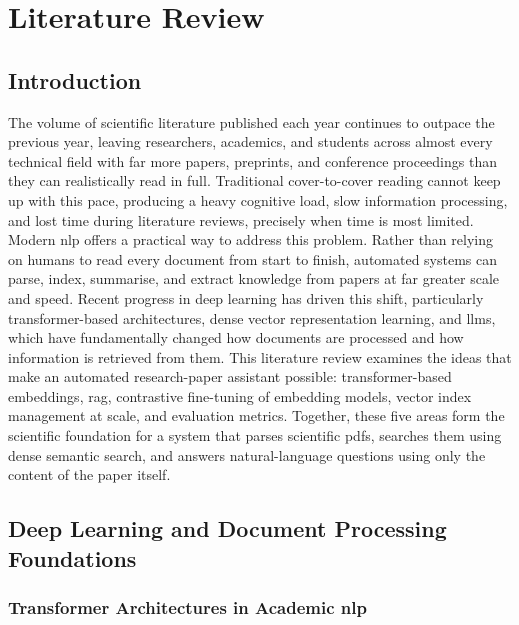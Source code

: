 \chapter{Literature Review}

\section{Introduction}

The volume of scientific literature published each year continues to outpace the previous year, leaving researchers, academics, and students across almost every technical field with far more papers, preprints, and conference proceedings than they can realistically read in full. Traditional cover-to-cover reading cannot keep up with this pace, producing a heavy cognitive load, slow information processing, and lost time during literature reviews, precisely when time is most limited.
\newline \newline Modern \gls{nlp} offers a practical way to address this problem. Rather than relying on humans to read every document from start to finish, automated systems can parse, index, summarise, and extract knowledge from papers at far greater scale and speed. Recent progress in deep learning has driven this shift, particularly transformer-based architectures, dense vector representation learning, and \gls{llm}s, which have fundamentally changed how documents are processed and how information is retrieved from them.
\newline \newline This literature review examines the ideas that make an automated research-paper assistant possible: transformer-based embeddings, \gls{rag}, contrastive fine-tuning of embedding models, vector index management at scale, and evaluation metrics. Together, these five areas form the scientific foundation for a system that parses scientific \gls{pdf}s, searches them using dense semantic search, and answers natural-language questions using only the content of the paper itself.

\section{Deep Learning and Document Processing Foundations}

\subsection{Transformer Architectures in Academic \gls{nlp}}

